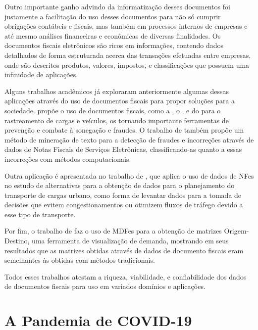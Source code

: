 Outro importante ganho advindo da informatização desses documentos foi justamente a facilitação do uso desses documentos para não só cumprir obrigações contábeis e fiscais, mas também em processos internos de empresas e até mesmo análises financeiras e econômicas de diversas finalidades. Os  documentos fiscais eletrônicos são ricos em informações, contendo dados detalhados de forma estruturada acerca das transações efetuadas entre empresas, onde são descritos produtos, valores, impostos, e classificações que possuem uma infinidade de aplicações.

Alguns trabalhos acadêmicos já exploraram anteriormente algumas dessas aplicações através do uso de documentos fiscais para propor soluções para a sociedade.  propõe o uso de documentos fiscais, como a , o , e do  para o rastreamento de cargas e veículos, os tornando importante ferramentas de prevenção e combate à sonegação e fraudes. O trabalho de  também propõe um método de mineração de texto para a detecção de fraudes e incorreções através de dados de Notas Fiscais de Serviços Eletrônicas, classificando-as quanto a essas incorreções com métodos computacionais.

Outra aplicação é apresentada no trabalho de , que aplica o uso de dados de NFes no estudo de alternativas para a obtenção de dados para o planejamento do transporte de cargas urbano, como forma de levantar dados para a tomada de decisões que evitem congestionamentos ou otimizem fluxos de tráfego devido a esse tipo de transporte.

Por fim, o trabalho de  faz o uso de MDFes para a obtenção de matrizes Origem-Destino, uma ferramenta de visualização de demanda, mostrando em seus resultados que as matrizes obtidas através de dados de documento fiscais eram semelhantes às obtidas com métodos tradicionais.

Todos esses trabalhos atestam a riqueza, viabilidade, e confiabilidade dos dados de documentos fiscais para uso em variados domínios e aplicações.

\section{A Pandemia de COVID-19}
\label{introducao:pandemia}

